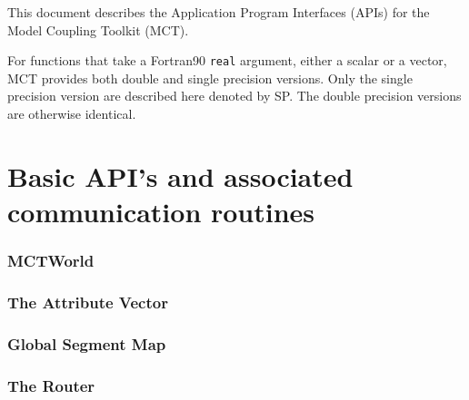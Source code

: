 \documentclass{article}
\begin{document}
\vspace*{\fill}


\newpage
\setcounter{page}{3}     %

\vspace*{\fill}

This document describes the Application Program Interfaces (APIs)
for the Model Coupling Toolkit (MCT).

For functions that take a Fortran90 {\tt real} argument, either a scalar or
a vector, MCT provides both double and single precision versions.  Only
the single precision version are described here denoted by SP.  The double precision versions
are otherwise identical.

\vspace*{\fill}
\newpage

\tableofcontents
\newpage



\part{Basic API's and associated communication routines}
%
\section{MCTWorld}

\vspace*{\fill}
\newpage
%
%
\section{The Attribute Vector}

\vspace*{\fill}
\newpage
%

\vspace*{\fill}
\newpage
%

\vspace*{\fill}
\newpage
%
%
\section{Global Segment Map}

\vspace*{\fill}
\newpage
%

\vspace*{\fill}
\newpage
%
%
\section{The Router}

\vspace*{\fill}
\newpage
%
%
\end{document}
